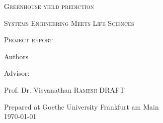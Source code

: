 \documentclass[a4paper,12pt]{article}
\begin{document}
\setlength\parindent{0pt}
\begin{titlepage}
	\centering
	\vspace{5cm}
	{\scshape\LARGE Greenhouse yield prediction \par}
	\vspace{0.5cm}
	{\scshape Systems Engineering Meets Life Sciences \par}
	{\scshape Project report\par}
	\vspace{2cm}
	{\large Authors\par}
	\vspace{0.5cm}
	

	\vfill
	Advisor:\par
	Prof. Dr. Visvanathan  \textsc{Ramesh}
	\vfill
	\huge
	DRAFT
	\vfill

	{\large Prepared at Goethe University Frankfurt am Main \\ \today\par}
\end{titlepage}

\tableofcontents
\newpage
{}







\newpage

\newpage





\newpage



%



\newpage
\printbibliography
\end{document}

